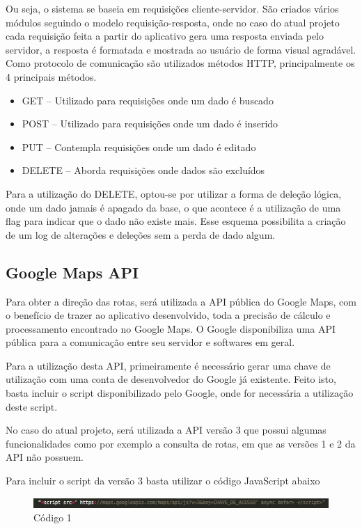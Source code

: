 Ou seja, o sistema se baseia em requisições cliente-servidor. São criados vários módulos seguindo o modelo requisição-resposta, onde no caso do atual projeto cada requisição feita a partir do aplicativo gera uma resposta enviada pelo servidor, a resposta é formatada e mostrada ao usuário de forma visual agradável. Como protocolo de comunicação são utilizados métodos HTTP, principalmente os 4 principais métodos.

\begin{itemize}
\item GET – Utilizado para requisições onde um dado é buscado
\item POST – Utilizado para requisições onde um dado é inserido
\item PUT – Contempla requisições onde um dado é editado
\item DELETE – Aborda requisições onde dados são excluídos

\end{itemize}
	
	Para a utilização do DELETE, optou-se por utilizar a forma de deleção lógica, onde um dado jamais é apagado da base, o que acontece é a utilização de uma flag para indicar que o dado não existe mais. Esse esquema possibilita a criação de um log de alterações e deleções sem a perda de dado algum.

\subsection{Google Maps API}
Para obter a direção das rotas, será utilizada a API pública do Google Maps, com o benefício de trazer ao aplicativo desenvolvido, toda a precisão de cálculo e processamento encontrado no Google Maps.
O Google disponibiliza uma API pública para a comunicação entre seu servidor e  softwares em geral.

Para a utilização desta API, primeiramente é necessário gerar uma chave de utilização com uma conta de desenvolvedor do Google já existente. Feito isto, basta incluir o script disponibilizado pelo Google, onde for necessária a utilização deste script. 

No caso do atual projeto, será utilizada a API versão 3 que possui algumas funcionalidades como por exemplo a consulta de rotas, em que as versões 1 e 2 da API não possuem.

Para incluir o script da versão 3 basta utilizar o código JavaScript abaixo

\graphicspath{{figuras/}}
\begin{figure}[h!]
\centering
\includegraphics[scale=0.80]{codigo1}
\caption{Código 1}
\label{img:codigo1}
\end{figure}

